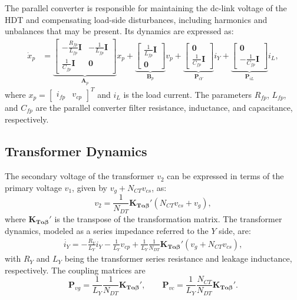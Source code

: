 The parallel converter is responsible for maintaining the dc-link voltage of the HDT and compensating load-side disturbances, including harmonics and unbalances that may be present. Its dynamics are expressed as:
\begin{align}
    \dot{x}_p &=
        \underbrace{\begin{bmatrix}
            -\tfrac{R_{fp}}{L_{fp}} \mathbf{I} & -\tfrac{1}{L_{fp}} \mathbf{I}\\[4pt]
             \tfrac{1}{C_{fp}} \mathbf{I} & \mathbf{0}
        \end{bmatrix}}_{\mathbf{A}_p}
        x_p
        +
        \underbrace{\begin{bmatrix}
            \tfrac{1}{L_{fp}}\mathbf{I}\\[4pt]
            \mathbf{0}
        \end{bmatrix}}_{\mathbf{B}_p} v_p
        +
        \underbrace{\begin{bmatrix}
            \mathbf{0}\\[4pt]
            \tfrac{1}{C_{fp}}\mathbf{I}
        \end{bmatrix}}_{\mathbf{P}_{iY}} i_Y
        +
        \underbrace{\begin{bmatrix}
            \mathbf{0}\\[4pt]
            -\tfrac{1}{C_{fp}}\mathbf{I}
        \end{bmatrix}}_{\mathbf{P}_{iL}} i_L ,
    \label{eq:ParallelConverter}
\end{align}
where $x_p = \begin{bmatrix} i_{fp} & v_{cp} \end{bmatrix}^T$ and $i_L$ is the load current. The parameters $R_{fp}$, $L_{fp}$, and $C_{fp}$ are the parallel converter filter resistance, inductance, and capacitance, respectively.

\subsection{Transformer Dynamics}

The secondary voltage of the transformer $v_2$ can be expressed in terms of the primary voltage $v_1$, given by $v_g + N_{CT} v_{cs}$, as:
\begin{equation}
    v_2 = \frac{1}{N_{DT}} \mathbf{K_{T\alpha\beta}}' (N_{CT} v_{cs} + v_g),
\end{equation}
where $\mathbf{K_{T\alpha\beta}}'$ is the transpose of the transformation matrix. The transformer dynamics, modeled as a series impedance referred to the $Y$ side, are:
\begin{align}
    \dot{i_Y} = -\frac{R_Y}{L_Y}i_Y - \frac{1}{L_Y} v_{cp}
    + \frac{1}{L_Y}\frac{1}{N_{DT}} \mathbf{K_{T\alpha\beta}}'(v_g + N_{CT} v_{cs}),
    \label{eq:Transformer}
\end{align}
with $R_Y$ and $L_Y$ being the transformer series resistance and leakage inductance, respectively. The coupling matrices are
\[
    \mathbf{P}_{vg} = \frac{1}{L_Y}\frac{1}{N_{DT}} \mathbf{K_{T\alpha\beta}}', \qquad
    \mathbf{P}_{vc} = \frac{1}{L_Y}\frac{N_{CT}}{N_{DT}} \mathbf{K_{T\alpha\beta}}' .
\]

